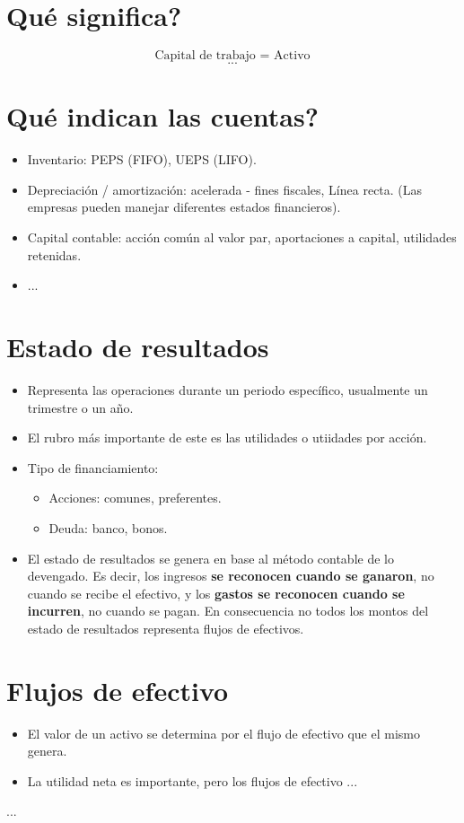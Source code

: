 \section{Qué significa?}
\[
  \text{ Capital de trabajo } = \text{ Activo }
\]
\[
  \text{...} 
\]

\section{Qué indican las cuentas?}
\begin{itemize}
    \item Inventario: PEPS (FIFO), UEPS (LIFO).
    \item Depreciación / amortización: acelerada - fines fiscales, Línea recta. (Las empresas pueden manejar diferentes estados financieros).
    \item Capital contable: acción común al valor par, aportaciones a capital, utilidades retenidas.
    \item ... 
\end{itemize}

\section{Estado de resultados}
\begin{itemize}
    \item Representa las operaciones durante un periodo específico, usualmente un trimestre o un año.
    \item El rubro más importante de este es las utilidades o utiidades por acción. 
    \item Tipo de financiamiento:
        \begin{itemize}
            \item Acciones: comunes, preferentes. 
            \item Deuda: banco, bonos.
        \end{itemize}
    
    \item El estado de resultados se genera en base al método contable de lo devengado. Es decir, los ingresos \textbf{se reconocen cuando se ganaron}, no cuando se recibe el efectivo, y los \textbf{gastos se reconocen cuando se incurren}, no cuando se pagan. En consecuencia no todos los montos del estado de resultados representa flujos de efectivos.
\end{itemize}

\section{Flujos de efectivo}
\begin{itemize}
    \item El valor de un activo se determina por el flujo de efectivo que el mismo genera. 
    \item La utilidad neta es importante, pero los flujos de efectivo ...
\end{itemize}

...


